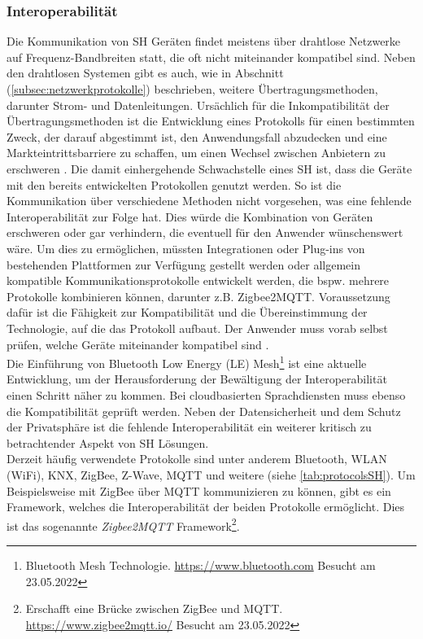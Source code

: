         \subsubsection*{Interoperabilität}
            Die Kommunikation von \acl{SH} Geräten findet meistens über drahtlose Netzwerke auf Frequenz-Bandbreiten statt, die oft nicht 
            miteinander kompatibel sind. Neben den drahtlosen Systemen gibt es auch, wie in Abschnitt (\ref{subsec:netzwerkprotokolle}) beschrieben, 
            weitere Übertragungsmethoden, darunter Strom- und Datenleitungen. Ursächlich für die Inkompatibilität der Übertragungsmethoden 
            ist die Entwicklung eines Protokolls für einen bestimmten 
            Zweck, der darauf abgestimmt ist, den Anwendungsfall abzudecken und eine Markteintrittsbarriere zu 
            schaffen, um einen Wechsel zwischen Anbietern zu erschweren \cite{statista2021}. 
            Die damit einhergehende Schwachstelle eines \acl{SH} ist, dass die Geräte mit den bereits entwickelten 
            Protokollen genutzt werden. So ist die Kommunikation über verschiedene Methoden nicht vorgesehen, was 
            eine fehlende Interoperabilität zur Folge hat. Dies würde die Kombination von Geräten erschweren oder gar verhindern, die eventuell 
            für den Anwender wünschenswert wäre. Um dies zu ermöglichen, müssten Integrationen 
            oder Plug-ins von bestehenden Plattformen zur Verfügung gestellt werden oder allgemein kompatible Kommunikationsprotokolle 
            entwickelt werden, die bspw. mehrere Protokolle kombinieren können, darunter z.B. Zigbee2MQTT. 
            Voraussetzung dafür ist die Fähigkeit zur Kompatibilität und die Übereinstimmung der Technologie, auf die das Protokoll aufbaut.
            Der Anwender muss vorab selbst prüfen, welche Geräte miteinander kompatibel sind \cite{statista2021}.
            \\
            \linebreak
            Die Einführung von Bluetooth Low Energy (LE) Mesh\footnote{Bluetooth Mesh Technologie. \url{https://www.bluetooth.com} Besucht am 23.05.2022} 
            ist eine aktuelle Entwicklung, um der Herausforderung der Bewältigung der Interoperabilität einen Schritt näher zu kommen. Bei cloudbasierten 
            Sprachdiensten muss ebenso die Kompatibilität geprüft werden. 
            Neben der Datensicherheit und dem Schutz der Privatsphäre ist die fehlende Interoperabilität ein weiterer kritisch zu betrachtender Aspekt von 
            \acs{SH} Lösungen.
            \\ 
            \linebreak
            Derzeit häufig verwendete Protokolle sind unter anderem Bluetooth, \ac{WLAN} (WiFi), KNX, ZigBee, Z-Wave, 
            MQTT und weitere (siehe \ref{tab:protocolsSH}). Um Beispielsweise mit ZigBee über \acs{MQTT} kommunizieren zu 
            können, gibt es ein Framework, welches die Interoperabilität der beiden Protokolle ermöglicht. Dies ist das 
            sogenannte \textit{Zigbee2MQTT} Framework\footnote{Erschafft eine Brücke zwischen ZigBee und MQTT. \url{https://www.zigbee2mqtt.io/} Besucht am 23.05.2022}.
